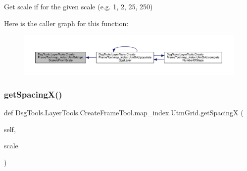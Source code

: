 \begin{DoxyVerb}Get scale if for the given scale (e.g. 1, 2, 25, 250)
\end{DoxyVerb}
 Here is the caller graph for this function\+:
\nopagebreak
\begin{figure}[H]
\begin{center}
\leavevmode
\includegraphics[width=350pt]{class_dsg_tools_1_1_layer_tools_1_1_create_frame_tool_1_1map__index_1_1_utm_grid_af41076b4415ef2d1ad434f4a9f73ca1f_icgraph}
\end{center}
\end{figure}
\mbox{\label{class_dsg_tools_1_1_layer_tools_1_1_create_frame_tool_1_1map__index_1_1_utm_grid_a678ab9e5c9a2457837c2719eeeb1c0be}} 
\subsubsection{\texorpdfstring{get\+Spacing\+X()}{getSpacingX()}}
{\footnotesize\ttfamily def Dsg\+Tools.\+Layer\+Tools.\+Create\+Frame\+Tool.\+map\+\_\+index.\+Utm\+Grid.\+get\+SpacingX (\begin{DoxyParamCaption}\item[{}]{self,  }\item[{}]{scale }\end{DoxyParamCaption})}

